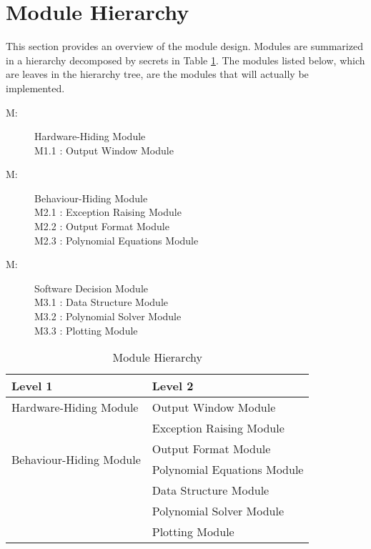 \documentclass[12pt, titlepage]{article}
\newcounter{mnum}
\newcommand{\mthemnum}{M\themnum}
\begin{document}
\section{Module Hierarchy} \label{SecMH}

This section provides an overview of the module design. Modules are summarized
in a hierarchy decomposed by secrets in Table \ref{TblMH}. The modules listed
below, which are leaves in the hierarchy tree, are the modules that will
actually be implemented.

\begin{description}
\item [ \mthemnum \label{mHH}:] Hardware-Hiding Module \\ 
\setlength\parindent{24pt} M1.1 \label{mOW}: Output Window Module 
\item [ \mthemnum \label{mBH}:] Behaviour-Hiding Module \\
\setlength\parindent{24pt} M2.1 \label{mER}: Exception Raising Module \\
\setlength\parindent{24pt} M2.2 \label{mOF}: Output Format Module \\
\setlength\parindent{24pt} M2.3 \label{mPE}: Polynomial Equations Module
\item [ \mthemnum \label{mSD}:] Software Decision Module \\
\setlength\parindent{24pt} M3.1 \label{mDS}: Data Structure Module \\
\setlength\parindent{24pt} M3.2 \label{mPS}: Polynomial Solver Module \\
\setlength\parindent{24pt} M3.3 \label{mP}: Plotting Module
\end{description}


\begin{table}[h!]
\centering
\begin{tabular}{p{} p{}}
\toprule
\textbf{Level 1} & \textbf{Level 2}\\
\midrule

{Hardware-Hiding Module} 
& Output Window Module \\
\midrule

\multirow{4}{0.3\textwidth}{Behaviour-Hiding Module} 
& Exception Raising Module\\
& Output Format Module\\
& Polynomial Equations Module\\

\midrule

\multirow{3}{0.3\textwidth}{Software Decision Module} & 
Data Structure Module\\
& Polynomial Solver Module\\
& Plotting Module \\
\bottomrule

\end{tabular}
\caption{Module Hierarchy}
\label{TblMH}
\end{table}
\end{document}

